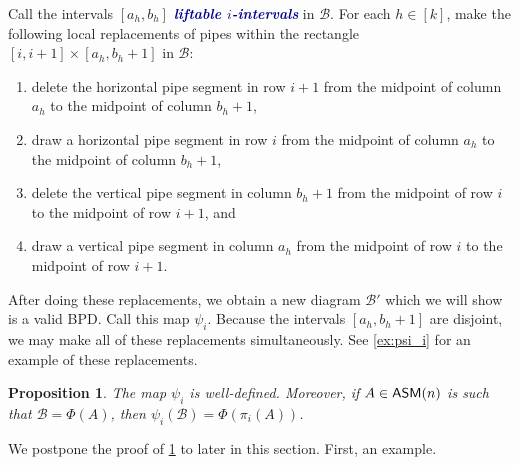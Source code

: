 \documentclass[12 pt]{amsart}
\newcommand{\newword}[1]{\textcolor{darkblue}{\textbf{\emph{#1}}}}
\newtheorem{proposition}[Theorem]{Proposition}
\numberwithin{equation}{section}
\newcommand{\asmtobpd}{\Phi}
\theoremstyle{remark}
\newcommand{\asm}{{\sf ASM}}
\begin{document}
Call the intervals $[a_h,b_h]$ \newword{liftable $i$-intervals} in $\mathcal B$.
For each $h\in[k]$, make the following local replacements of pipes within the rectangle $[i,i+1]\times[a_h,b_h+1]$ in $\mathcal B$:
\begin{enumerate}
    \item delete the horizontal pipe segment in row $i+1$ from the midpoint of column $a_h$ to the midpoint of column $b_h+1$,
    \item  draw a horizontal pipe segment in row $i$ from the midpoint of column $a_h$ to the midpoint of column $b_h+1$,
    \item delete the vertical pipe segment in column $b_h+1$ from the midpoint of row $i$ to the midpoint of row $i+1$, and
    \item draw a vertical pipe segment in column $a_h$ from the midpoint of row $i$ to the midpoint of row $i+1$.
\end{enumerate}
After doing these replacements, we obtain a new diagram $\mathcal B'$ which we will show is a valid BPD.  Call this map $\psi_i$. Because the intervals $[a_h,b_h+1]$ are disjoint, we may make all of these replacements simultaneously.  See \cref{ex:psi_i} for an example of these replacements.

\begin{proposition}
\label{prop:weakorderbpd}
    The map $\psi_i$ is well-defined.  Moreover, if $A \in \asm(n)$ is such that $\mathcal{B}=\asmtobpd(A)$, then $\psi_i(\mathcal{B})=\asmtobpd(\pi_i(A))$.
\end{proposition}

We postpone the proof of \cref{prop:weakorderbpd} to later in this section.  First, an example.
\end{document}
